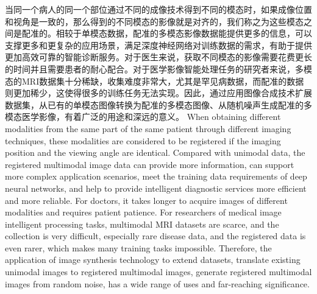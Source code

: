 \documentclass[letterpaper]{article} %
\begin{document}
当同一个病人的同一个部位通过不同的成像技术得到不同的模态时，如果成像位置和视角是一致的，那么得到的不同模态的影像就是对齐的，我们称之为这些模态之间是配准的。相较于单模态数据，配准的多模态影像数据能提供更多的信息，可以支撑更多和更复杂的应用场景，满足深度神经网络对训练数据的需求，有助于提供更加高效可靠的智能诊断服务。对于医生来说，获取不同模态的影像需要花费更长的时间并且需要患者的耐心配合。对于医学影像智能处理任务的研究者来说，多模态的MRI数据集十分稀缺，收集难度非常大，尤其是罕见病数据，而配准的数据则更加稀少，这使得很多的训练任务无法实现。因此，通过应用图像合成技术扩展数据集，从已有的单模态图像转换为配准的多模态图像、从随机噪声生成配准的多模态医学影像，有着广泛的用途和深远的意义。
When obtaining different modalities from the same part of the same patient  through different imaging techniques, these modalities are considered to be registered if the imaging position and the viewing angle are identical.  Compared with unimodal data, the registered multimodal image data can provide more information, can support more complex application scenarios, meet the training data requirements of deep neural networks, and help to provide  intelligent diagnostic services more efficient and more reliable. For doctors, it takes longer to acquire images of different modalities and requires patient patience. For researchers of medical image intelligent processing tasks, multimodal MRI datasets are scarce, and the collection is very difficult, especially rare disease data, and the registered data is even rarer, which makes many training tasks impossible. Therefore, the application of image synthesis technology to extend datasets, translate existing unimodal images to registered multimodal images, generate registered multimodal images from random noise, has a wide range of uses and far-reaching significance.
\end{document}
